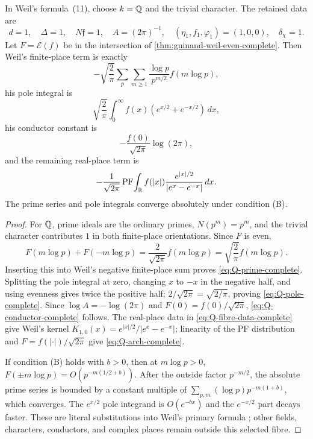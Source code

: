 \begin{theorem}[Termwise $k=\Q$, $\chi=1$ specialization]
\label{thm:weil-Q-specialization-complete}
In Weil's formula~(11), choose $k=\Q$ and the trivial character.  The retained
data are
\begin{equation}
 d=1,\quad\Delta=1,\quad N\mathfrak f=1,\quad A=(2\pi)^{-1},\quad
 (\eta_1,f_1,\varphi_1)=(1,0,0),\quad\delta_\chi=1.
 \label{eq:Q-fibre-data-complete}
\end{equation}
Let $F=\mathcal E(f)$ be in the intersection of
\cref{thm:guinand-weil-even-complete}.  Then Weil's finite-place term is
exactly
\begin{equation}
 -\sqrt{\frac2\pi}\sum_p\sum_{m\geq1}
 \frac{\log p}{p^{m/2}}f(m\log p),
 \label{eq:Q-prime-complete}
\end{equation}
his pole integral is
\begin{equation}
 \sqrt{\frac2\pi}\int_0^\infty
 f(x)(e^{x/2}+e^{-x/2})\,dx,
 \label{eq:Q-pole-complete}
\end{equation}
his conductor constant is
\begin{equation}
 -\frac{f(0)}{\sqrt{2\pi}}\log(2\pi),
 \label{eq:Q-conductor-complete}
\end{equation}
and the remaining real-place term is
\begin{equation}
 -\frac1{\sqrt{2\pi}}\operatorname{PF}\!\int_\mathbb R
 f(|x|)\frac{e^{|x|/2}}{|e^x-e^{-x}|}\,dx.
 \label{eq:Q-arch-complete}
\end{equation}
The prime series and pole integrals converge absolutely under condition (B).
\end{theorem}

\begin{proof}
For $\mathbb{Q}$, prime ideals are the ordinary primes, $N(p^m)=p^m$, and the
trivial character contributes $1$ in both finite-place orientations.  Since
$F$ is even,
\[
 F(m\log p)+F(-m\log p)
 =\frac{2}{\sqrt{2\pi}}f(m\log p)
 =\sqrt{\frac2\pi}f(m\log p).
\]
Inserting this into Weil's negative finite-place sum proves
\eqref{eq:Q-prime-complete}.  Splitting the pole integral at zero, changing
$x$ to $-x$ in the negative half, and using evenness gives twice the positive
half; $2/\sqrt{2\pi}=\sqrt{2/\pi}$, proving
\eqref{eq:Q-pole-complete}.  Since $\log A=-\log(2\pi)$ and
$F(0)=f(0)/\sqrt{2\pi}$, \eqref{eq:Q-conductor-complete} follows.
The real-place data in \eqref{eq:Q-fibre-data-complete} give Weil's kernel
$K_{1,0}(x)=e^{|x|/2}/|e^x-e^{-x}|$; linearity of the PF distribution and
$F=f(|\cdot|)/\sqrt{2\pi}$ give \eqref{eq:Q-arch-complete}.

If condition (B) holds with $b>0$, then at $m\log p>0$,
$F(\pm m\log p)=O(p^{-m(1/2+b)})$.  After the outside factor $p^{-m/2}$,
the absolute prime series is bounded by a constant multiple of
$\sum_{p,m}(\log p)p^{-m(1+b)}$, which converges.  The $e^{x/2}$ pole
integrand is $O(e^{-bx})$ and the $e^{-x/2}$ part decays faster.  These are
literal substitutions into Weil's primary formula
\cite[Collected Papers II, pp.~57--58, eq.~(11)]{weil1952}; other fields,
characters, conductors, and complex places remain outside this selected
fibre.
\end{proof}

